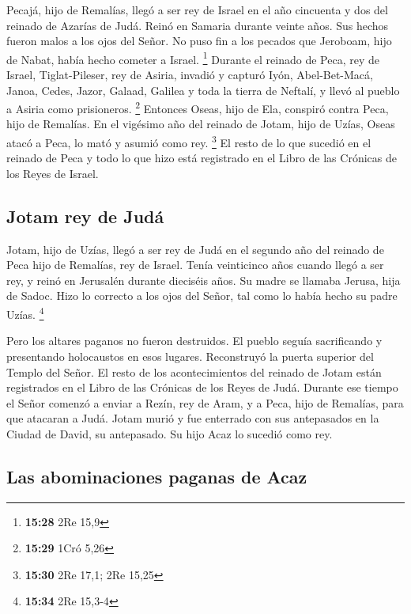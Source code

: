  Pecajá, hijo de Remalías, llegó a ser rey de Israel en
el año cincuenta y dos del reinado de Azarías de Judá. Reinó en Samaria
durante veinte años.  Sus hechos fueron malos a los ojos
del Señor. No puso fin a los pecados que Jeroboam, hijo de Nabat, había
hecho cometer a Israel. \footnote{\textbf{15:28} 2Re 15,9}
 Durante el reinado de Peca, rey de Israel,
Tiglat-Pileser, rey de Asiria, invadió y capturó Iyón, Abel-Bet-Macá,
Janoa, Cedes, Jazor, Galaad, Galilea y toda la tierra de Neftalí, y
llevó al pueblo a Asiria como prisioneros. \footnote{\textbf{15:29} 1Cró
  5,26}  Entonces Oseas, hijo de Ela, conspiró contra
Peca, hijo de Remalías. En el vigésimo año del reinado de Jotam, hijo de
Uzías, Oseas atacó a Peca, lo mató y asumió como rey. \footnote{\textbf{15:30}
  2Re 17,1; 2Re 15,25}  El resto de lo que sucedió en el
reinado de Peca y todo lo que hizo está registrado en el Libro de las
Crónicas de los Reyes de Israel.

\hypertarget{jotam-rey-de-juduxe1}{%
\subsection{Jotam rey de Judá}\label{jotam-rey-de-juduxe1}}

 Jotam, hijo de Uzías, llegó a ser rey de Judá en el
segundo año del reinado de Peca hijo de Remalías, rey de Israel.
 Tenía veinticinco años cuando llegó a ser rey, y reinó
en Jerusalén durante dieciséis años. Su madre se llamaba Jerusa, hija de
Sadoc.  Hizo lo correcto a los ojos del Señor, tal como
lo había hecho su padre Uzías. \footnote{\textbf{15:34} 2Re 15,3-4}

 Pero los altares paganos no fueron destruidos. El pueblo
seguía sacrificando y presentando holocaustos en esos lugares.
Reconstruyó la puerta superior del Templo del Señor.  El
resto de los acontecimientos del reinado de Jotam están registrados en
el Libro de las Crónicas de los Reyes de Judá.  Durante
ese tiempo el Señor comenzó a enviar a Rezín, rey de Aram, y a Peca,
hijo de Remalías, para que atacaran a Judá.  Jotam murió
y fue enterrado con sus antepasados en la Ciudad de David, su
antepasado. Su hijo Acaz lo sucedió como rey.

\hypertarget{las-abominaciones-paganas-de-acaz}{%
\subsection{Las abominaciones paganas de
Acaz}\label{las-abominaciones-paganas-de-acaz}}

